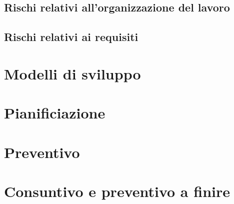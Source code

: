 \documentclass[a4paper, oneside, openany, dvipsnames, table]{article}
\begin{document}
	\subsection{Rischi relativi all'organizzazione del lavoro}
	\subsection{Rischi relativi ai requisiti}
\section{Modelli di sviluppo}
\section{Pianificiazione}
\section{Preventivo}
\section{Consuntivo e preventivo a finire}
\end{document}
